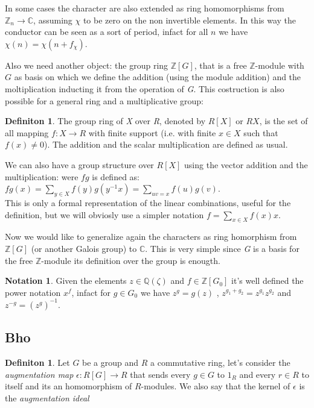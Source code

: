 \documentclass[]{article}
\theoremstyle{plain}
\theoremstyle{remark}
\theoremstyle{definition}
\newtheorem{deff}[teo]{Definiton}
\newtheorem*{nota}{Notation}
\newcommand{\Z}{\mathbb{Z}}
\newcommand{\Q} {\mathbb{Q}}
\newcommand{\C} {\mathbb{C}}
\begin{document}
	 In some cases the character are also extended as ring homomorphisms from $ \Z_n \to \C $, assuming $ \chi $ to be zero on the non invertible elements. In this way the conductor can be seen as a sort of period, infact for all $ n $ we have $ \chi(n)=\chi(n+f_\chi) $. 
	 
	 Also we need another object: the group ring $ \Z[G] $, that is a free $ \Z $-module with $ G $ as basis on which we define the addition (using the module addition)  and the moltiplication inducting it from the operation of \textit{G}.
	 This costruction is also possible for a general ring and a multiplicative group:
	 
	 \begin{deff}
	 	The group ring of \textit{X} over \textit{R}, denoted by $ R[X] $ or $ RX $, is the set of all mapping $ f : X \to R $ with finite support (i.e. with finite $ x \in X $ such that $ f(x) \neq 0 $). The addition and the scalar multiplication are defined as usual. 
	 \end{deff}
 
 	We can also have a group structure over $ R[X] $ using the vector addition and the multiplication: were $ fg $ is defined as: $ fg(x) = \sum_{ y \in X } f(y)g(y^{-1}x) = \sum_{uv = x} f(u)g(v)$.\\
 	This is only a formal representation of the linear combinations, useful for the definition, but we will obviosly use a simpler notation $ f = \sum_{x \in X} f(x) x $.
 	
 	Now we would like to generalize again the characters as ring homorphism from $ \Z[G] $ (or another Galois group) to $ \C $. This is very simple since \textit{G} is a basis for the free $ \Z $-module its definition over the group is enougth. 
	
	\begin{nota}
		Given the elements $ z \in \Q (\zeta) $ and $ f \in \Z[G_0]  $ it's well defined the power notation $ x^f $, infact for $ g\in G_0 $ we have $ z^g = g(z) $ , $ z ^{g_1 + g_2}= z^{g_1} z^{g_2} $ and $ z^{-g} = (z^g)^{-1} $. 
	\end{nota}
	
	\subsection{Bho}
	\begin{deff}
		Let $ G $ be a group and $ R $ a commutative ring, let's consider the \textit{augmentation map} $\epsilon : R[G] \to R$ that sends every $ g \in G $ to $ 1_R $ and every $ r \in R $ to itself and its an homomorphism of $ R $-modules. We also say that the kernel of $\epsilon$ is the \textit{augmentation ideal}
	\end{deff}
\end{document}
